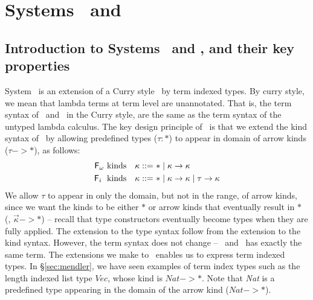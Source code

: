 \section{Systems \Fi\ and \Fixi}\label{sec:Fi}

\subsection{Introduction to Systems \Fi\ and \Fixi, and their key properties}
System \Fi\ is an extension of a Curry style \Fw\ by term indexed types.
By curry style, we mean that lambda terms at term level are unannotated.
That is, the term syntax of \Fi\ and \Fw\, in the Curry style, are
the same as the term syntax of the untyped lambda calculus.
The key design principle of \Fi\ is that we extend the kind syntax of \Fw\
by allowing predefined types ($\tau : *$) to appear in domain of arrow kinds
($\tau -> *$), as follows:
\begin{align*}
\text{\ensuremath{\mathsf{F}_\omega}\ kinds} ~~~ \kappa ::= ~ & * \mid \kappa -> \kappa \\
\text{\ensuremath{\mathsf{F}_i}\; kinds}~~~ \kappa ::= ~ & * \mid \kappa -> \kappa \mid \tau -> \kappa
\end{align*}
We allow $\tau$ to appear in only the domain, but not in the range, of
arrow kinds, since we want the kinds to be either $*$ or arrow kinds
that eventually result in $*$ (\ie, $\vec{\kappa} -> *$) -- recall that
type constructors eventually become types when they are fully applied.
The extension to the type syntax follow from the extension to the kind syntax.
However, the term syntax does not change -- \Fi\ and \Fw\ has exactly the
same term.
The extensions we make to \Fi\ enables us to express term indexed types.
In \S\ref{sec:mendler}, we have seen examples of term index types such as
the length indexed list type $\textit{Vec}$, whose kind is $\textit{Nat} -> *$.
Note that \textit{Nat} is a predefined type appearing in the domain of
the arrow kind ($\textit{Nat} -> *$).

